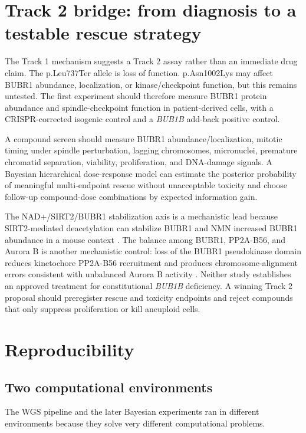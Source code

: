 \documentclass[11pt]{article}
\begin{document}
\section{Track 2 bridge: from diagnosis to a testable rescue strategy}

The Track 1 mechanism suggests a Track 2 assay rather than an immediate drug claim. The p.Leu737Ter allele is loss of function. p.Asn1002Lys may affect BUBR1 abundance, localization, or kinase/checkpoint function, but this remains untested. The first experiment should therefore measure BUBR1 protein abundance and spindle-checkpoint function in patient-derived cells, with a CRISPR-corrected isogenic control and a \textit{BUB1B} add-back positive control.

A compound screen should measure BUBR1 abundance/localization, mitotic timing under spindle perturbation, lagging chromosomes, micronuclei, premature chromatid separation, viability, proliferation, and DNA-damage signals. A Bayesian hierarchical dose-response model can estimate the posterior probability of meaningful multi-endpoint rescue without unacceptable toxicity and choose follow-up compound-dose combinations by expected information gain.

The NAD+/SIRT2/BUBR1 stabilization axis is a mechanistic lead because SIRT2-mediated deacetylation can stabilize BUBR1 and NMN increased BUBR1 abundance in a mouse context \citep{sirt2bubr12014}. The balance among BUBR1, PP2A-B56, and Aurora B is another mechanistic control: loss of the BUBR1 pseudokinase domain reduces kinetochore PP2A-B56 recruitment and produces chromosome-alignment errors consistent with unbalanced Aurora B activity \citep{bubr1pp2a2020}. Neither study establishes an approved treatment for constitutional \textit{BUB1B} deficiency. A winning Track 2 proposal should preregister rescue and toxicity endpoints and reject compounds that only suppress proliferation or kill aneuploid cells.

\section{Reproducibility}

\subsection{Two computational environments}

The WGS pipeline and the later Bayesian experiments ran in different environments because they solve very different computational problems.
\end{document}
